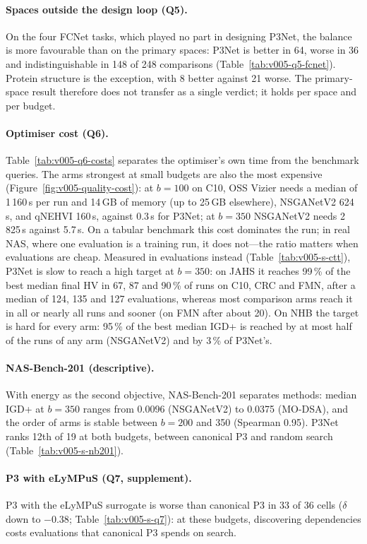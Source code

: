 \paragraph{Spaces outside the design loop (Q5).} On the four FCNet tasks, which played no part in designing P3Net,
the balance is more favourable than on the primary spaces: P3Net is better in 64, worse in 36 and indistinguishable in
148 of 248 comparisons (Table~\ref{tab:v005-q5-fcnet}). Protein structure is the exception, with 8 better against 21
worse. The primary-space result therefore does not transfer as a single verdict; it holds per space and per budget.

\paragraph{Optimiser cost (Q6).} Table~\ref{tab:v005-q6-costs} separates the optimiser's own time from the
benchmark queries. The arms strongest at small budgets are also the most expensive
(Figure~\ref{fig:v005-quality-cost}): at $b = 100$ on C10, OSS Vizier
needs a median of 1\,160\,s per run and 14\,GB of memory (up to 25\,GB elsewhere), NSGANetV2 624\,s, and qNEHVI 160\,s, against 0.3\,s for
P3Net; at $b = 350$ NSGANetV2 needs 2\,825\,s against 5.7\,s. On a tabular benchmark this cost dominates the run; in
real NAS, where one evaluation is a training run, it does not---the ratio matters when evaluations are cheap.
Measured in evaluations instead (Table~\ref{tab:v005-s-ctt}), P3Net is slow to reach a high target at $b = 350$: on
JAHS it reaches 99\,\% of the best median final HV in 67, 87 and 90\,\% of runs on C10, CRC and FMN, after a
median of 124, 135 and 127 evaluations, whereas most comparison arms reach it in all or nearly all runs and sooner
(on FMN after about 20). On NHB the target is hard for every arm: 95\,\% of the best median IGD+ is reached by at
most half of the runs of any arm (NSGANetV2) and by 3\,\% of P3Net's.

\paragraph{NAS-Bench-201 (descriptive).} With energy as the second objective, NAS-Bench-201 separates methods: median
IGD+ at $b = 350$ ranges from 0.0096 (NSGANetV2) to 0.0375 (MO-DSA), and the order of arms is stable between
$b = 200$ and 350 (Spearman 0.95). P3Net ranks 12th of 19 at both budgets, between canonical P3 and random search
(Table~\ref{tab:v005-s-nb201}).

\paragraph{P3 with eLyMPuS (Q7, supplement).} P3 with the eLyMPuS surrogate is worse than canonical P3 in 33 of 36
cells ($\delta$ down to $-0.38$; Table~\ref{tab:v005-s-q7}): at these budgets, discovering dependencies costs evaluations that canonical P3 spends
on search.

